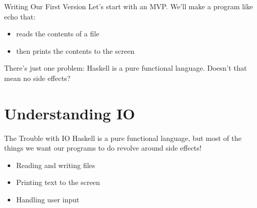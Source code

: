 \documentclass[10pt, presentation, colorlinks]{beamer}
\begin{document}
\begin{frame}[label={sec:org448011e}]{Writing Our First Version}
Let's start with an MVP. We'll make a program like \alert{echo} that:

\bigskip
\begin{itemize}
\item reads the contents of a file
\item then prints the contents to the screen
\end{itemize}
\bigskip

\pause
There's just one problem: Haskell is a \alert{pure} functional language. Doesn't that mean \alert{no side effects}?
\end{frame}


\section{Understanding IO}
\label{sec:orgcdc8f4b}

\begin{frame}[label={sec:org138bb78}]{The Trouble with IO}
Haskell is a \alert{pure functional} language, but most of the things we want our programs to do revolve around \alert{side effects}!

\bigskip

\pause
\begin{itemize}
\item Reading and writing files
\end{itemize}
\pause
\begin{itemize}
\item Printing text to the screen
\end{itemize}
\pause
\begin{itemize}
\item Handling user input
\end{itemize}
\end{frame}
\end{document}
